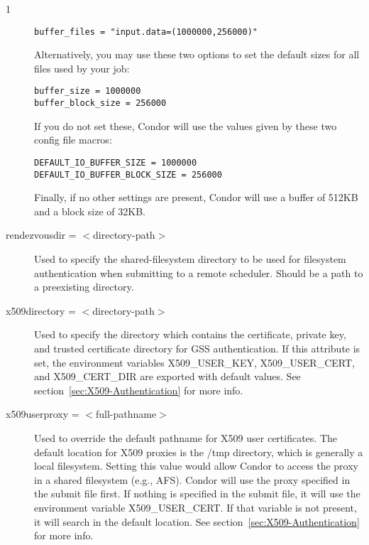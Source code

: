 \begin{ManPage}{\label{man-condor-submit}}{1}
\begin{description}
\begin{verbatim}
buffer_files = "input.data=(1000000,256000)"
\end{verbatim}

Alternatively, you may use these two options to set
the default sizes for all files used by your job:

\begin{verbatim}
buffer_size = 1000000
buffer_block_size = 256000
\end{verbatim}

If you do not set these, Condor will use the values given by these
two config file macros:

\begin{verbatim}
DEFAULT_IO_BUFFER_SIZE = 1000000
DEFAULT_IO_BUFFER_BLOCK_SIZE = 256000
\end{verbatim}

Finally, if no other settings are present, Condor will use a buffer of 512KB
and a block size of 32KB.


\item[rendezvousdir = $<$directory-path$>$] Used to specify the 
shared-filesystem directory to be used for filesystem authentication
when submitting to a remote scheduler.  Should be a path to a preexisting 
directory.  


\item[x509directory = $<$directory-path$>$] Used to specify the directory 
which contains the certificate, private key, and trusted certificate directory
for GSS authentication. If this attribute is set, the environment variables 
X509\_USER\_KEY, X509\_USER\_CERT, and X509\_CERT\_DIR are exported with 
default values. See section~\ref{sec:X509-Authentication} for more info.


\item[x509userproxy = $<$full-pathname$>$] Used to override the default
pathname for X509 user certificates. The default location for X509 proxies
is the /tmp directory, which is generally a local filesystem. Setting
this value would allow Condor to access the proxy in a shared filesystem
(e.g., AFS). Condor will use the proxy specified in the submit file
first. If nothing is specified in the submit file, it will use the
environment variable X509\_USER\_CERT. If that variable is not present,
it will search in the default location. See 
section~\ref{sec:X509-Authentication} for more info.


\end{description}
\end{ManPage}

